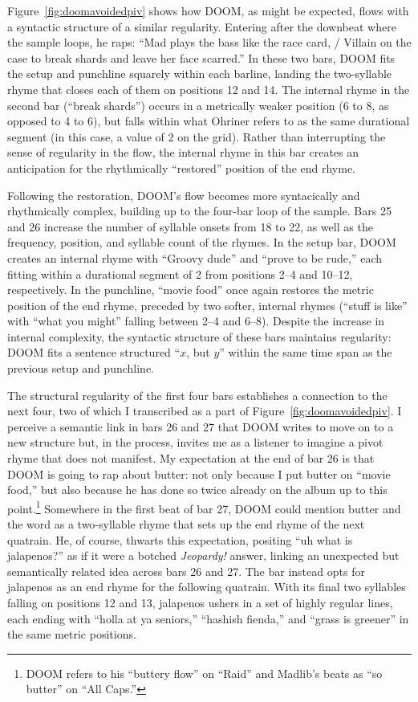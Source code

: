 Figure~\ref{fig:doomavoidedpiv} shows how DOOM, as might be expected, flows with a syntactic structure of a 
similar regularity. Entering after the downbeat where the sample loops, he raps: ``Mad plays the bass like the
race card, / Villain on the case to break shards and leave her face scarred.'' In these two bars, DOOM fits the
setup and punchline squarely within each barline, landing the two-syllable rhyme that closes each of them on 
positions 12 and 14. The internal rhyme in the second bar (``break shards'') occurs in a metrically weaker
position (6 to 8, as opposed to 4 to 6), but falls within what Ohriner refers to as the same durational segment
(in this case, a value of 2 on the grid). Rather than interrupting the sense of regularity in the flow, the 
internal rhyme in this bar creates an anticipation for the rhythmically ``restored'' position of the end rhyme.

Following the restoration, DOOM's flow becomes more syntacically and rhythmically complex, building up to
the four-bar loop of the sample. Bars 25 and 26 increase the number of syllable onsets from 18 to 22, as 
well as the  frequency, position, and syllable count of the rhymes. In the setup bar, DOOM creates an 
internal rhyme with ``Groovy dude'' and ``prove to  be rude,'' each fitting within a durational segment of
2 from positions 2--4 and 10--12, respectively. In the punchline, ``movie food'' once again restores the
metric position of the end rhyme, preceded by two softer, internal rhymes (``stuff is like'' with ``what
you might'' falling between 2--4 and 6--8). Despite the increase in internal complexity, the  syntactic 
structure of these bars maintains regularity: DOOM fits a sentence structured ``$x$, but $y$'' within the
same time span as the previous setup and punchline.
\clearpage

The structural regularity of the first four bars establishes a connection to the next four, two of which I
transcribed as a part of Figure~\ref{fig:doomavoidedpiv}. I perceive a semantic link in bars 26 and 27 that
DOOM writes to move on to a new structure but, in the process, invites me as a listener to imagine a pivot rhyme
that does not manifest. My expectation at the end  of bar 26 is that DOOM is going to rap about butter: not only 
because I put butter on ``movie food,'' but also because he has done so twice already on the album up to this
point.\footnote{
    DOOM refers to his ``buttery flow'' on ``Raid'' and Madlib's beats as ``so butter'' on ``All 
    Caps.''}
Somewhere in the first beat of bar 27, DOOM could mention butter and the word as a two-syllable rhyme that
sets up the end rhyme of the next quatrain. He, of course, thwarts this expectation, positing ``uh\textellipsis
what is jalapenos?'' as if  it were a botched  \textit{Jeopardy!} answer, linking an unexpected but semantically
related idea across bars 26 and 27. The bar instead opts for jalapenos as an end rhyme for the following quatrain.
With its final two syllables falling on positions 12 and 13, jalapenos ushers in a set of highly regular lines,
each ending with ``holla at ya  seniors,'' ``hashish fienda,'' and ``grass is greener'' in the same metric 
positions.

